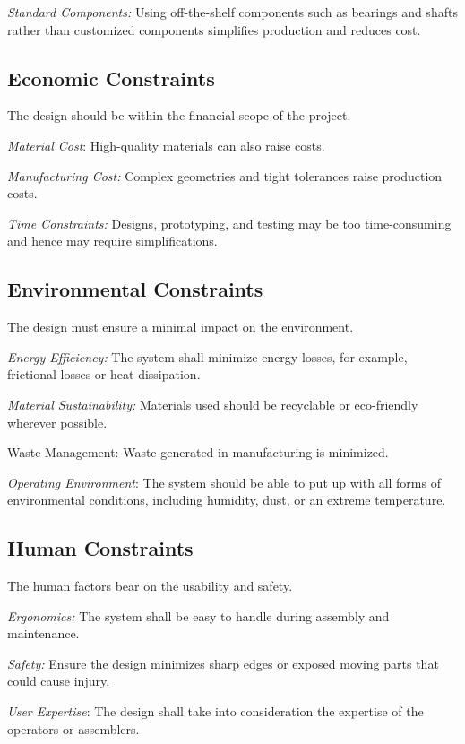 \documentclass[../../main]{subfiles}
\begin{document}
\emph{Standard Components:} Using off-the-shelf components such as
bearings and shafts rather than customized components simplifies
production and reduces cost.

\subsection{Economic Constraints}

The design should be within the financial scope of the project.

\emph{Material Cost}: High-quality materials can also raise costs.

\emph{Manufacturing Cost:} Complex geometries and tight tolerances raise
production costs.

\emph{Time Constraints:} Designs, prototyping, and testing may be too
time-consuming and hence may require simplifications.

\subsection{Environmental Constraints}

The design must ensure a minimal impact on the environment.

\emph{Energy Efficiency:} The system shall minimize energy losses, for
example, frictional losses or heat dissipation.

\emph{Material Sustainability:} Materials used should be recyclable or
eco-friendly wherever possible.

Waste Management: Waste generated in manufacturing is minimized.

\emph{Operating Environment}: The system should be able to put up with
all forms of environmental conditions, including humidity, dust, or an
extreme temperature.

\subsection{Human Constraints}

The human factors bear on the usability and safety.

\emph{Ergonomics:} The system shall be easy to handle during assembly
and maintenance.

\emph{Safety:} Ensure the design minimizes sharp edges or exposed moving
parts that could cause injury.

\emph{User Expertise}: The design shall take into consideration the
expertise of the operators or assemblers.
\end{document}
